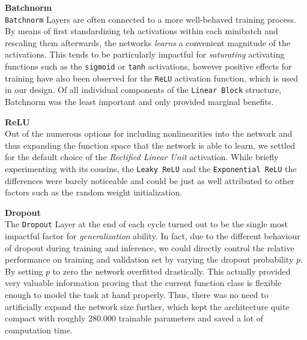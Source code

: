 \documentclass[12pt, letterpaper]{article}
\begin{document}
\textbf{Batchnorm} \\
\texttt{Batchnorm} Layers are often connected to a more well-behaved training process.
By means of first standardizing teh activations within each minibatch and rescaling them afterwards, the networks \emph{learns} a convenient magnitude of the activations.
This tends to be particularly impactful for \emph{saturating} activating functions such as the \texttt{sigmoid} or \texttt{tanh} activations, however positive effects for training have also been observed for the \texttt{ReLU} activation function, which is used in our design.
Of all individual components of the \texttt{Linear Block} structure, Batchnorm was the least important and only provided marginal benefits.

\textbf{ReLU} \\
Out of the numerous options for including nonlinearities into the network and thus expanding the function space that the network is able to learn, we settled for the default choice of the \emph{Rectified Linear Unit} activation.
While briefly experimenting with its cousins, the \texttt{Leaky ReLU} and the \texttt{Exponential ReLU} the differences were barely noticeable and could be just as well attributed to other factors such as the random weight initialization.

\textbf{Dropout} \\
The \texttt{Dropout} Layer at the end of each cycle turned out to be the single most impactful factor for \emph{generalization} ability.
In fact, due to the different behaviour of dropout during training and inference, we could directly control the relative performance on training and validation set by varying the dropout probability $p$.
By setting $p$ to zero the network overfitted drastically.
This actually provided very valuable information proving that the current function class is flexible enough to model the task at hand properly.
Thus, there was no need to artificially expand the network size further, which kept the architecture quite compact with roughly $280.000$ trainable parameters and saved a lot of computation time.
\end{document}
